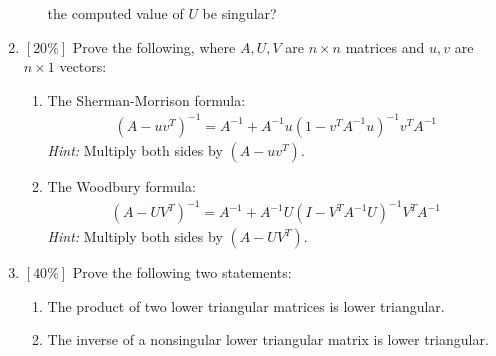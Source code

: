 \documentclass{article}
\begin{document}
\begin{enumerate}
\begin{enumerate}
the computed value of $U$ be singular?
\end{enumerate}
\newpage
\item
$[20\%]$ Prove the following, where $A,U,V$ are $n\times n$ matrices and $u,v$
are $n\times1$ vectors:
\begin{enumerate}
\item
The Sherman-Morrison formula:
\begin{eqnarray*}
(A-uv^T)^{-1}=A^{-1}+A^{-1}u(1-v^TA^{-1}u)^{-1}v^TA^{-1}
\end{eqnarray*}
\emph{Hint:} Multiply both sides by $(A-uv^T)$.
\item
The Woodbury formula:
\begin{eqnarray*}
(A-UV^T)^{-1}=A^{-1}+A^{-1}U(I-V^TA^{-1}U)^{-1}V^TA^{-1}
\end{eqnarray*}
\emph{Hint:} Multiply both sides by $(A-UV^T)$.
\end{enumerate}
\item $[40\%]$ Prove the following two statements:
\begin{enumerate}
\item
The product of two lower triangular matrices is lower triangular.
\item
The inverse of a nonsingular lower triangular matrix is lower triangular.
\end{enumerate}
\end{enumerate}
\end{document}
